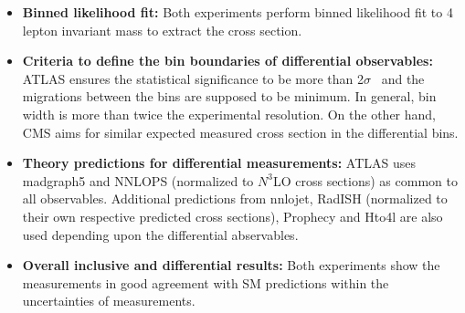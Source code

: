 \begin{itemize}
	\item \textbf{Binned likelihood fit:} Both experiments perform binned likelihood fit to 4 lepton invariant mass to extract the cross section.    
	\item \textbf{Criteria to define the bin boundaries of differential observables:} ATLAS ensures the statistical significance to be more than 2$\sigma$ ~and the migrations between the bins are supposed to be minimum. In general, bin width is more than twice the experimental resolution. On the other hand, CMS aims for similar expected measured cross section in the differential bins.  %
	\item \textbf{Theory predictions for differential measurements:} ATLAS uses {\sc madgraph5} and {\sc NNLOPS} (normalized to $N^{3}$LO cross sections) as common to all observables. Additional predictions from {\sc nnlojet}, {\sc RadISH} (normalized to their own respective predicted cross sections), {\sc Prophecy} and {\sc Hto4l} are also used depending upon the differential abservables.   \label{theory_pred} 
	\item \textbf{Overall inclusive and differential results:} Both experiments show the measurements in good agreement with SM predictions within the uncertainties of measurements. %

 \end{itemize}


